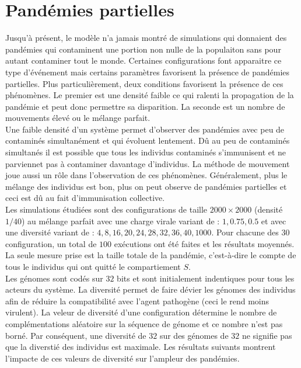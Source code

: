 \section{Pandémies partielles}

Jusqu'à présent, le modèle n'a jamais montré de simulations qui donnaient des pandémies qui contaminent une portion non nulle de la populaiton sans pour autant contaminer tout le monde. Certaines configurations font apparaitre ce type d'événement mais certains paramètres favorisent la présence de pandémies partielles. Plus particulièrement, deux conditions favorisent la présence de ces phénomènes. Le premier est une densité faible ce qui ralenti la propagation de la pandémie et peut donc permettre sa disparition. La seconde est un nombre de mouvements élevé ou le mélange parfait.\\

Une faible densité d'un système permet d'observer des pandémies avec peu de contaminés simultanément et qui évoluent lentement. Dû au peu de contaminés simultanés il est possible que tous les individus contaminés s'immunisent et ne parviennet pas à contaminer davantage d'individus. La méthode de mouvement joue aussi un rôle dans l'observation de ces phénomènes. Généralement, plus le mélange des individus est bon, plus on peut observe de pandémies partielles et ceci est dû au fait d'immunisation collective.\\

Les simulations étudiées sont des configurations de taille $2000 \times 2000$ (densité $1/40$) au mélange parfait avec une charge virale variant de : $1, 0.75, 0.5$ et avec une diversité variant de : $4,8,16,20,24,28,32,36,40,1000$. Pour chacune des $30$ configuration, un total de $100$ exécutions ont été faites et les résultats moyennés. La seule mesure prise est la taille totale de la pandémie, c'est-à-dire le compte de tous le individus qui ont quitté le compartiement $S$.\\

Les génomes sont codés sur $32$ bits et sont initialement indentiques pour tous les acteurs du système. La diversité permet de faire dévier les génomes des individus afin de réduire la compatibilité avec l'agent pathogène (ceci le rend moins virulent). La veleur de diversité d'une configuration détermine le nombre de complémentations aléatoire sur la séquence de génome et ce nombre n'est pas borné. Par conséquent, une diversité de $32$ sur des génomes de $32$ ne signifie pas que la diverstié des individus est maximale. Les résultats suivants montrent l'impacte de ces valeurs de diversité sur l'ampleur des pandémies.

